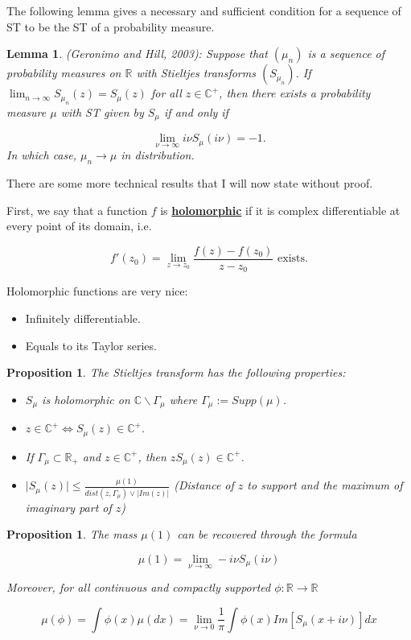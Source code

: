 \documentclass[twoside]{article}
\newtheorem{lemma}[theorem]{Lemma}
\newtheorem{proposition}[theorem]{Proposition}
\begin{document}
The following lemma gives a necessary and sufficient condition for a sequence of ST to be the ST of a probability measure.\\

\begin{lemma}
	(Geronimo and Hill, 2003): Suppose that $(\mu_n)$ is a sequence of probability measures on $\mathbb{R}$ with Stieltjes transforms $(S_{\mu_n})$. If $\lim_{n\to\infty}S_{\mu_n}(
	z)=S_{\mu}(z)$ for all $z\in\mathbb{C}^+$, then there exists a probability measure $\mu$ with ST given by $S_\mu$ if and only if
	
	$$\lim_{\nu\to\infty}i\nu S_\mu(i\nu)=-1.$$
	In which case, $\mu_n\to\mu$ in distribution.
\end{lemma}

There are some more technical results that I will now state without proof.

First, we say that a function $f$ is \underline{\textbf{holomorphic}} if it is complex differentiable at every point of its domain, i.e.

$$f'(z_0)=\lim_{z\to z_0}\frac{f(z)-f(z_0)}{z-z_0}\text{ exists}.$$

Holomorphic functions are very nice:

\begin{itemize}
	\item Infinitely differentiable.
	\item Equals to its Taylor series.
\end{itemize}

\begin{proposition}
	The Stieltjes transform has the following properties:
	\begin{itemize}
		\item $S_\mu$ is holomorphic on $\mathbb{C}\backslash\Gamma_\mu$ where $\Gamma_\mu:=Supp(\mu)$.
		\item $z\in\mathbb{C}^+\iff S_\mu(z)\in\mathbb{C}^+.$
		\item If $\Gamma_\mu\subset \mathbb{R}_+$ and $z\in\mathbb{C}^+$, then $zS_\mu(z)\in\mathbb{C}^+$.
		\item $\lvert S_\mu(z)\rvert \leq \frac{\mu(1)}{dist(z, \Gamma_\mu) \vee \lvert Im(z)\rvert}$ (Distance of $z$ to support and the maximum of imaginary part of $z$)
	\end{itemize}
\end{proposition}

\begin{proposition}
	The mass $\mu(1)$ can be recovered through the formula
	
	$$\mu(1)=\lim_{\nu\to\infty}-i\nu S_\mu(i\nu)$$
	
	Moreover, for all continuous and compactly supported $\phi:\mathbb{R}\to\mathbb{R}$
	
	$$\mu(\phi)=\int\phi(x)\mu(dx)=\lim_{\nu\to0}\frac1\pi\int\phi(x)Im[S_\mu(x+i\nu)]dx$$
\end{proposition}
\end{document}
